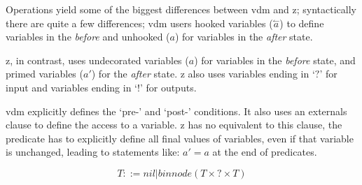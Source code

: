 \documentclass[a4paper, notitlepage, fleqn]{article}
\begin{document}
Operations yield some of the biggest differences between \gls{vdm} and \gls{z}; syntactically
there are quite a few differences; \gls{vdm} users hooked variables 
($\overset{\leftharpoonup}{a}$) to define variables in the \textit{before} and unhooked ($a$) for
variables in the \textit{after} state.

\Gls{z}, in contrast, uses undecorated variables ($a$) for variables in the \textit{before} state,
and primed variables ($a'$) for the \textit{after} state. \Gls{z} also uses variables ending in 
`$?$' for input and variables ending in `$!$' for outputs.

\Gls{vdm} explicitly defines the `pre-' and `post-' conditions. It also uses an externals clause
to define the access to a variable. \Gls{z} has no equivalent to this clause, the predicate has to
explicitly define all final values of variables, even if that variable is unchanged, leading to
statements like: $a' = a$ at the end of predicates.


\begin{equation}
T::=nil|binnode\left({ T \times ? \times T}\right)
\end{equation}




\end{document}
